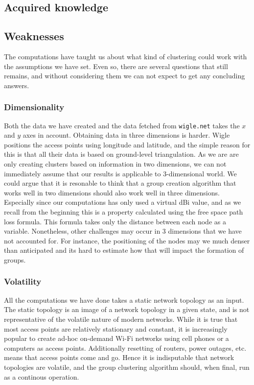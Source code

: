 \subsection{Acquired knowledge}
\subsection{Weaknesses}
The computations have taught us about what kind of clustering could work with the assumptions we have set. Even so, there are several questions that still remains,
and without considering them we can not expect to get any concluding answers. 

\subsubsection{Dimensionality} 
Both the data we have created and the data fetched from \verb|wigle.net| takes the $x$ and $y$ axes in account. Obtaining data in three dimensions is harder.
Wigle positions the access points using longitude and latitude, and the simple reason for this is that all their data is based on ground-level triangulation.
As we are are only creating clusters based on information in two dimensions, we can not immediately assume that our results is applicable to 3-dimensional world. 
We could argue that it is resonable to think that a group creation algorithm that works well in two dimensions should also work well in three dimensions. Especially since our computations has only
used a virtual dBi value, and as we recall from the beginning this is a property calculated using the free space path loss formula. This formula takes only the distance between each node
as a variable. Nonetheless, other challenges may occur in 3 dimensions that we have not accounted for. For instance, 
the positioning of the nodes may we much denser than anticipated and its hard to estimate how that will impact the formation of groups. 

\subsubsection{Volatility} 
All the computations we have done takes a static network topology as an input. The static topology is an image of a network topology in a given state, and is not representative
of the volatile nature of modern networks. While it is true that most access points are relatively stationary and constant, it is increasingly popular to create
ad-hoc on-demand Wi-Fi networks using cell phones or a computers as access points. Additionally resetting of routers, power outages, etc. means that access points come and go. 
Hence it is indisputable that network topologies are volatile, and the group clustering algorithm should, when final, run as a continous operation. 

